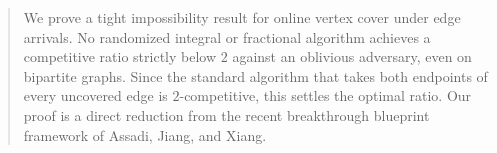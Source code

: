 \begin{abstract}
We prove a tight impossibility result for online vertex cover under edge
arrivals.  No randomized integral or fractional algorithm achieves a
competitive ratio strictly below $2$ against an oblivious adversary, even on
bipartite graphs.  Since the standard algorithm that takes both endpoints of
every uncovered edge is $2$-competitive, this settles the optimal ratio.  Our
proof is a direct reduction from the recent breakthrough blueprint framework
of Assadi, Jiang, and Xiang.
\end{abstract}
